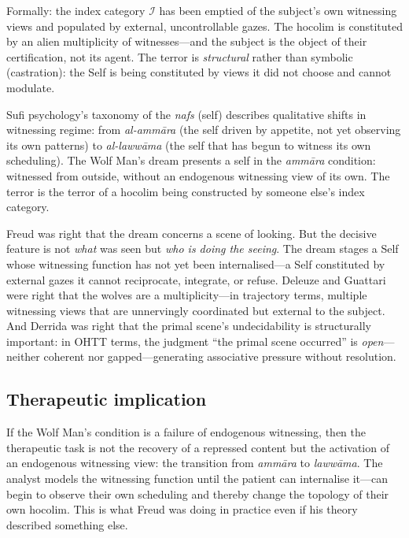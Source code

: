 Formally: the index category $\mathcal{I}$ has been emptied of the subject's own witnessing views and populated by external, uncontrollable gazes.  The hocolim is constituted by an alien multiplicity of witnesses---and the subject is the object of their certification, not its agent.  The terror is \textit{structural} rather than symbolic (castration): the Self is being constituted by views it did not choose and cannot modulate.

Sufi psychology's taxonomy of the \textit{nafs} (self) describes qualitative shifts in witnessing regime: from \textit{al-amm\=ara} (the self driven by appetite, not yet observing its own patterns) to \textit{al-laww\=ama} (the self that has begun to witness its own scheduling).  The Wolf Man's dream presents a self in the \textit{amm\=ara} condition: witnessed from outside, without an endogenous witnessing view of its own.  The terror is the terror of a hocolim being constructed by someone else's index category.

Freud was right that the dream concerns a scene of looking.  But the decisive feature is not \textit{what} was seen but \textit{who is doing the seeing}.  The dream stages a Self whose witnessing function has not yet been internalised---a Self constituted by external gazes it cannot reciprocate, integrate, or refuse.  Deleuze and Guattari were right that the wolves are a multiplicity---in trajectory terms, multiple witnessing views that are unnervingly coordinated but external to the subject.  And Derrida was right that the primal scene's undecidability is structurally important: in OHTT terms, the judgment ``the primal scene occurred'' is \textit{open}---neither coherent nor gapped---generating associative pressure without resolution.

\subsection{Therapeutic implication}

If the Wolf Man's condition is a failure of endogenous witnessing, then the therapeutic task is not the recovery of a repressed content but the activation of an endogenous witnessing view: the transition from \textit{amm\=ara} to \textit{laww\=ama}.  The analyst models the witnessing function until the patient can internalise it---can begin to observe their own scheduling and thereby change the topology of their own hocolim.  This is what Freud was doing in practice even if his theory described something else.


